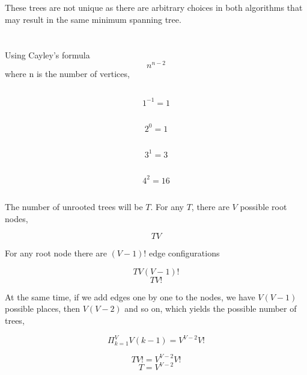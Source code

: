 \documentclass[journal]{IEEEtran}
\begin{document}
\subsection{}
These trees are not unique as there are arbitrary choices in both algorithms that may 
result in the same minimum spanning tree.

\section{}
Using Cayley's formula 
$$n^{n-2}$$
where n is the number of vertices,

\subsection{}
$$1^{-1} = \boxed{1}$$

\subsection{}
$$2^0 = \boxed{1}$$

\subsection{}
$$3^1 = \boxed{3}$$

\subsection{}
$$4^2 = \boxed{16}$$

\subsection{}
The number of unrooted trees will be $T$. For any $T$, there are $V$ possible root nodes,

$$TV$$

For any root node there are $(V-1)!$ edge configurations

$$TV(V-1)!$$
$$TV!$$

At the same time, if we add edges one by one to the nodes, we have $V(V-1)$ possible places, then
$V(V-2)$ and so on, which yields the possible number of trees,

$$\Pi_{k=1}^{V} V(k-1) = V^{V-2}V!$$

$$TV! = V^{V-2}V!$$
$$T = \boxed{V^{V-2}}$$
\end{document}
